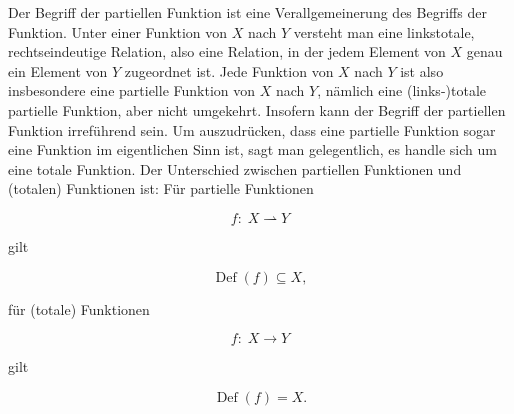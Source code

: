 \documentclass{lehramt-informatik-haupt}
\begin{document}
\begin{liExkurs}
Der Begriff der partiellen Funktion ist eine Verallgemeinerung des
Begriffs der Funktion. Unter einer Funktion von $X$ nach $Y$ versteht
man eine linkstotale, rechtseindeutige Relation, also eine Relation, in
der jedem Element von $X$ genau ein Element von $Y$ zugeordnet ist. Jede
Funktion von $X$ nach $Y$ ist also insbesondere eine partielle Funktion
von $X$ nach $Y$, nämlich eine (links-)totale partielle Funktion, aber
nicht umgekehrt. Insofern kann der Begriff der partiellen Funktion
irreführend sein. Um auszudrücken, dass eine partielle Funktion sogar
eine Funktion im eigentlichen Sinn ist, sagt man gelegentlich, es handle
sich um eine totale Funktion. Der Unterschied zwischen partiellen
Funktionen und (totalen) Funktionen ist: Für partielle Funktionen

\begin{displaymath}
f\colon \;X \rightharpoonup Y
\end{displaymath}

\noindent
gilt

\begin{displaymath}
\operatorname {Def} (f) \subseteq X ,
\end{displaymath}

\noindent
für (totale) Funktionen

\begin{displaymath}
f \colon \; X \to Y
\end{displaymath}

 gilt

\begin{displaymath}
\operatorname {Def} (f)=X .
\end{displaymath}

\end{liExkurs}


\literatur
\end{document}
